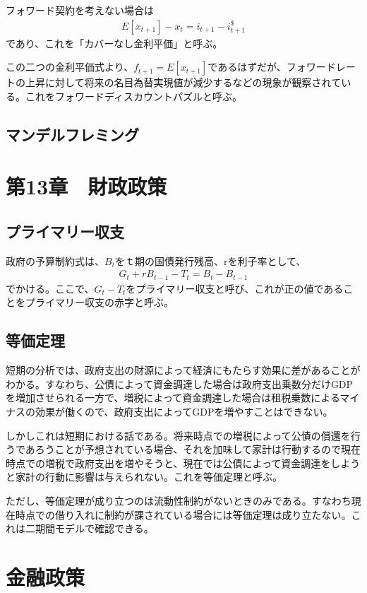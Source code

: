 \documentclass{jsarticle}
\begin{document}
フォワード契約を考えない場合は
\begin{align*}
	E[x_{t + 1}] - x_t = i_{t+1} - i_{t+1}^{\$}
\end{align*}
であり、これを「カバーなし金利平価」と呼ぶ。

この二つの金利平価式より、$f_{t+1} = E[x_{t+1}]$であるはずだが、フォワードレートの上昇に対して将来の名目為替実現値が減少するなどの現象が観察されている。これをフォワードディスカウントパズルと呼ぶ。

\subsection{マンデルフレミング}

\section{第13章　財政政策}
\subsection{プライマリー収支}
政府の予算制約式は、$B_t$をｔ期の国債発行残高、rを利子率として、
\begin{align*}
	G_t + rB_{t-1} - T_t = B_t - B_{t-1}
\end{align*}
でかける。ここで、$G_t - T_t$をプライマリー収支と呼び、これが正の値であることをプライマリー収支の赤字と呼ぶ。

\subsection{等価定理}
短期の分析では、政府支出の財源によって経済にもたらす効果に差があることがわかる。すなわち、公債によって資金調達した場合は政府支出乗数分だけGDPを増加させられる一方で、増税によって資金調達した場合は租税乗数によるマイナスの効果が働くので、政府支出によってGDPを増やすことはできない。

しかしこれは短期における話である。将来時点での増税によって公債の償還を行うであろうことが予想されている場合、それを加味して家計は行動するので現在時点での増税で政府支出を増やそうと、現在では公債によって資金調達をしようと家計の行動に影響は与えられない。これを等価定理と呼ぶ。

ただし、等価定理が成り立つのは流動性制約がないときのみである。すなわち現在時点での借り入れに制約が課されている場合には等価定理は成り立たない。これは二期間モデルで確認できる。

\section{金融政策}
\end{document}

